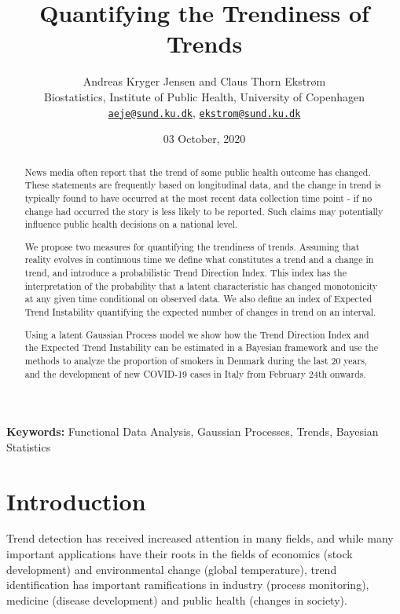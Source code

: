 \documentclass[
  11pt,
]{article}
\title{Quantifying the Trendiness of Trends}
\author{Andreas Kryger Jensen and Claus Thorn Ekstrøm\\
Biostatistics, Institute of Public Health, University of Copenhagen\\
\href{mailto:aeje@sund.ku.dk}{\nolinkurl{aeje@sund.ku.dk}},
\href{mailto:ekstrom@sund.ku.dk}{\nolinkurl{ekstrom@sund.ku.dk}}}
\date{03 October, 2020}
\theoremstyle{nonumberplain}
\begin{document}
\maketitle

\begin{abstract}
News media often report that the trend of some public health outcome has changed. These statements are frequently based on longitudinal data, and the change in trend is typically found to have occurred at the most recent data collection time point - if no change had occurred the story is less likely to be reported. Such claims may potentially influence public health decisions on a national level.

We propose two measures for quantifying the trendiness of trends. Assuming that reality evolves in continuous time we define what constitutes a trend and a change in trend, and introduce a probabilistic Trend Direction Index. This index has the interpretation of the probability that a latent characteristic has changed monotonicity at any given time conditional on observed data. We also define an index of Expected Trend Instability quantifying the expected number of changes in trend on an interval.

Using a latent Gaussian Process model we show how the Trend Direction Index and the Expected Trend Instability can be estimated in a Bayesian framework and use the methods to analyze the proportion of smokers in Denmark during the last 20 years, and the development of new COVID-19 cases in Italy from February 24th onwards.
\end{abstract}

\begin{center}
\textbf{Keywords:} Functional Data Analysis, Gaussian Processes, Trends, Bayesian Statistics
\end{center}

\hypertarget{introduction}{%
\section{Introduction}\label{introduction}}

Trend detection has received increased attention in many fields, and
while many important applications have their roots in the fields of
economics (stock development) and environmental change (global
temperature), trend identification has important ramifications in
industry (process monitoring), medicine (disease development) and public
health (changes in society).
\end{document}

